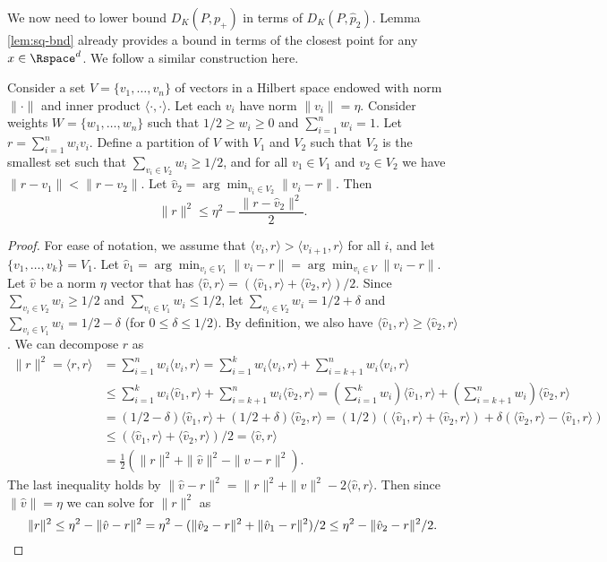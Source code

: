 \documentclass[11pt]{myclass}
\begin{document}
We now need to lower bound $D_K(P,p_+)$ in terms of $D_K(P,\hat p_2)$.
Lemma \ref{lem:sq-bnd} already provides a bound in terms of the closest point for any $x \in \Rspace^d$.  We follow a similar construction here.  


\begin{lemma}
\label{lem:vec-shrink2}
Consider a set $V = \{v_1, \ldots, v_n\}$ of vectors in a Hilbert space endowed with norm $\|\cdot\|$ and inner product $\langle \cdot, \cdot \rangle$.  Let each $v_i$ have norm $\|v_i\| = \eta$.  
Consider weights $W = \{w_1, \ldots, w_n\}$ such that $1/2 \geq w_i \geq 0$ and $\sum_{i=1}^n w_i = 1$.  Let $r = \sum_{i=1}^n w_i v_i$.  Define a partition of $V$ with $V_1$ and $V_2$ such that $V_2$ is the smallest set such that $\sum_{v_i \in V_2} w_i \geq 1/2$, and for all $v_1 \in V_1$ and $v_2 \in V_2$ we have $\| r- v_1\| < \| r - v_2\|$.  Let $\hat v_2 = \arg \min_{v_i \in V_2} \|v_i - r\|$.
Then
 \[
 \|r\|^2 \leq \eta^2 - \frac{\|r- \hat v_2\|^2}{2}.
 \]
\end{lemma}
\begin{proof}
For ease of notation, we assume that $\langle v_i,r\rangle > \langle v_{i+1}, r\rangle$ for all $i$, and let $\{v_1, \ldots, v_k\} = V_1$.    Let $\hat v_1 = \arg \min_{v_i \in V_1} \|v_i - r\| = \arg \min_{v_i \in V} \|v_i - r\|$.  
Let $\hat v$ be a norm $\eta$ vector that has $\langle \hat v,  r\rangle = (\langle \hat v_1, r \rangle + \langle \hat v_2, r \rangle)/2$.
Since  $\sum_{v_i \in V_2} w_i \geq 1/2$ and $\sum_{v_i \in V_1} w_i \leq 1/2$, 
let $\sum_{v_i \in V_2} w_i = 1/2 + \delta$ and $\sum_{v_i \in V_1} w_i = 1/2 - \delta$ (for $0 \leq \delta \leq 1/2)$. 
By definition, we also have $\langle \hat v_1, r \rangle \geq \langle \hat v_2, r \rangle$. 
We can decompose $r$ as 
\begin{align*}
\|r\|^2 
= 
\langle r, r\rangle 
&= 
\sum_{i=1}^n w_i \langle v_i, r \rangle
=
\sum_{i=1}^k w_i \langle v_i, r\rangle + \sum_{i={k+1}}^n w_i \langle v_i, r \rangle
\\ &\leq
\sum_{i=1}^k w_i \langle \hat v_1, r\rangle + \sum_{i=k+1}^n w_i \langle \hat v_2, r \rangle
= 
\left(\sum_{i=1}^k w_i\right) \langle \hat v_1, r\rangle  + \left(\sum_{i=k+1}^n w_i \right) \langle \hat v_2, r \rangle 
\\ &
= (1/2 - \delta) \langle \hat v_1, r \rangle + (1/2 + \delta)  \langle \hat v_2, r \rangle 
= (1/2) ( \langle \hat v_1, r\rangle + \langle \hat v_2, r \rangle) + \delta( \langle \hat v_2, r \rangle -  \langle \hat v_1, r \rangle)
\\ & \leq
(\langle \hat v_1, r \rangle + \langle \hat v_2, r \rangle)/2
= 
\langle \hat v, r \rangle
\\ &= 
\frac{1}{2} ( \|r\|^2 + \|\hat v\|^2 - \|\hat v - r\|^2).
\end{align*}
The last inequality holds by $\|\hat v - r\|^2 = \|r\|^2 + \|\hat v\|^2 - 2 \langle \hat v, r \rangle$.  
Then since $\|\hat v\| = \eta$ we can solve for $\|r\|^2$ as 
\[
\|r\|^2 \leq \eta^2 - \|\hat v - r\|^2 = \eta^2 - (\|\hat v_2 -r\|^2 + \|\hat v_1 - r\|^2)/2
\leq
\eta^2 - \|\hat v_2 - r\|^2/2.  \qedhere
\]
\end{proof}
\end{document}
